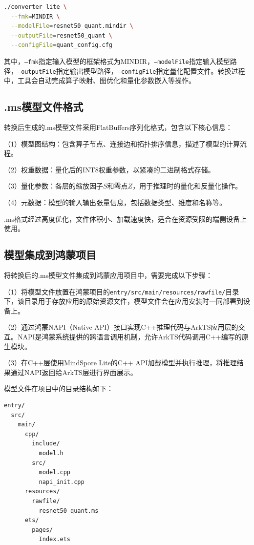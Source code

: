 \begin{lstlisting}[language=bash, caption={模型转换命令}]
./converter_lite \
  --fmk=MINDIR \
  --modelFile=resnet50_quant.mindir \
  --outputFile=resnet50_quant \
  --configFile=quant_config.cfg
\end{lstlisting}

其中，\texttt{--fmk}指定输入模型的框架格式为MINDIR，\texttt{--modelFile}指定输入模型路径，\texttt{--outputFile}指定输出模型路径，\texttt{--configFile}指定量化配置文件。转换过程中，工具会自动完成算子映射、图优化和量化参数嵌入等操作。

\subsection{.ms模型文件格式}

转换后生成的.ms模型文件采用FlatBuffers序列化格式，包含以下核心信息：

（1）模型图结构：包含算子节点、连接边和拓扑排序信息，描述了模型的计算流程。

（2）权重数据：量化后的INT8权重参数，以紧凑的二进制格式存储。

（3）量化参数：各层的缩放因子$S$和零点$Z$，用于推理时的量化和反量化操作。

（4）元数据：模型的输入输出张量信息，包括数据类型、维度和名称等。

.ms格式经过高度优化，文件体积小、加载速度快，适合在资源受限的端侧设备上使用。

\subsection{模型集成到鸿蒙项目}

将转换后的.ms模型文件集成到鸿蒙应用项目中，需要完成以下步骤：

（1）将模型文件放置在鸿蒙项目的\texttt{entry/src/main/resources/rawfile/}目录下，该目录用于存放应用的原始资源文件，模型文件会在应用安装时一同部署到设备上。

（2）通过鸿蒙NAPI（Native API）接口实现C++推理代码与ArkTS应用层的交互。NAPI是鸿蒙系统提供的跨语言调用机制，允许ArkTS代码调用C++编写的原生模块。

（3）在C++层使用MindSpore Lite的C++ API加载模型并执行推理，将推理结果通过NAPI返回给ArkTS层进行界面展示。

模型文件在项目中的目录结构如下：

\begin{lstlisting}[caption={模型文件目录结构}]
entry/
  src/
    main/
      cpp/
        include/
          model.h
        src/
          model.cpp
          napi_init.cpp
      resources/
        rawfile/
          resnet50_quant.ms
      ets/
        pages/
          Index.ets
\end{lstlisting}

